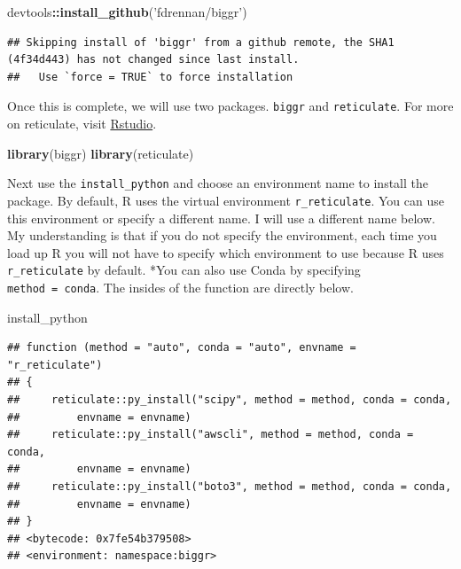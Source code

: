 \documentclass[]{book}
\newenvironment{Shaded}{\begin{snugshade}}{\end{snugshade}}
\newcommand{\KeywordTok}[1]{\textcolor[rgb]{0.13,0.29,0.53}{\textbf{#1}}}
\newcommand{\NormalTok}[1]{#1}
\newcommand{\OperatorTok}[1]{\textcolor[rgb]{0.81,0.36,0.00}{\textbf{#1}}}
\newcommand{\StringTok}[1]{\textcolor[rgb]{0.31,0.60,0.02}{#1}}
\begin{document}
\begin{Shaded}
\begin{Highlighting}[]
\NormalTok{devtools}\OperatorTok{::}\KeywordTok{install_github}\NormalTok{(}\StringTok{'fdrennan/biggr'}\NormalTok{)}
\end{Highlighting}
\end{Shaded}

\begin{verbatim}
## Skipping install of 'biggr' from a github remote, the SHA1 (4f34d443) has not changed since last install.
##   Use `force = TRUE` to force installation
\end{verbatim}

Once this is complete, we will use two packages. \texttt{biggr} and \texttt{reticulate}. For more on reticulate, visit \href{https://rstudio.github.io/reticulate/}{Rstudio}.

\begin{Shaded}
\begin{Highlighting}[]
\KeywordTok{library}\NormalTok{(biggr)}
\KeywordTok{library}\NormalTok{(reticulate)}
\end{Highlighting}
\end{Shaded}

Next use the \texttt{install\_python} and choose an environment name to install the package. By default, R uses the virtual environment \texttt{r\_reticulate}. You can use this environment or specify a different name. I will use a different name below. My understanding is that if you do not specify the environment, each time you load up R you will not have to specify which environment to use because R uses \texttt{r\_reticulate} by default. *You can also use Conda by specifying \texttt{method\ =\ conda}. The insides of the function are directly below.

\begin{Shaded}
\begin{Highlighting}[]
\NormalTok{install_python}
\end{Highlighting}
\end{Shaded}

\begin{verbatim}
## function (method = "auto", conda = "auto", envname = "r_reticulate") 
## {
##     reticulate::py_install("scipy", method = method, conda = conda, 
##         envname = envname)
##     reticulate::py_install("awscli", method = method, conda = conda, 
##         envname = envname)
##     reticulate::py_install("boto3", method = method, conda = conda, 
##         envname = envname)
## }
## <bytecode: 0x7fe54b379508>
## <environment: namespace:biggr>
\end{verbatim}
\end{document}
